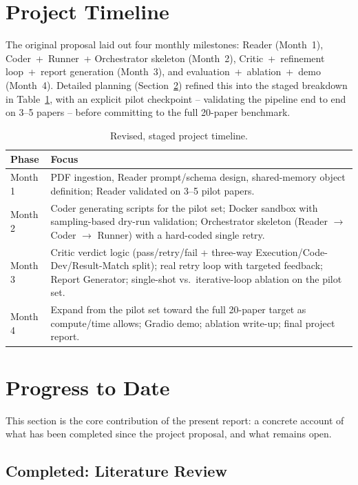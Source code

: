 \documentclass[10pt,twocolumn]{article}
\begin{document}
\section{Project Timeline}
\label{sec:timeline}

The original proposal laid out four monthly milestones: Reader (Month~1), Coder~+~Runner~+
Orchestrator skeleton (Month~2), Critic~+~refinement loop~+~report generation (Month~3),
and evaluation~+~ablation~+~demo (Month~4). Detailed planning (Section~\ref{sec:progress})
refined this into the staged breakdown in Table~\ref{tab:timeline}, with an explicit pilot
checkpoint -- validating the pipeline end to end on 3--5 papers -- before committing to
the full 20-paper benchmark.

\begin{table}[t]
\centering
\small
\begin{tabular}{@{}p{2.6cm}p{12.4cm}@{}}
\toprule
\textbf{Phase} & \textbf{Focus} \\
\midrule
Month 1 & PDF ingestion, Reader prompt/schema design, shared-memory object definition;
Reader validated on 3--5 pilot papers. \\
Month 2 & Coder generating scripts for the pilot set; Docker sandbox with sampling-based
dry-run validation; Orchestrator skeleton (Reader $\to$ Coder $\to$ Runner) with a
hard-coded single retry. \\
Month 3 & Critic verdict logic (pass/retry/fail + three-way Execution/Code-Dev/Result-Match
split); real retry loop with targeted feedback; Report Generator; single-shot vs.\
iterative-loop ablation on the pilot set. \\
Month 4 & Expand from the pilot set toward the full 20-paper target as compute/time
allows; Gradio demo; ablation write-up; final project report. \\
\bottomrule
\end{tabular}
\caption{Revised, staged project timeline.}
\label{tab:timeline}
\end{table}

\section{Progress to Date}
\label{sec:progress}

This section is the core contribution of the present report: a concrete account of what
has been completed since the project proposal, and what remains open.

\subsection{Completed: Literature Review}
\end{document}
